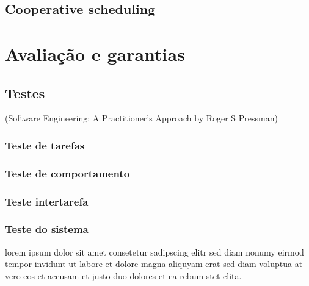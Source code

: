 \subsection{Cooperative scheduling}

\section{\label{sec:secao5}Avaliação e garantias}
\subsection{Testes}
(Software Engineering: A Practitioner's Approach by Roger S Pressman)
\subsubsection{Teste de tarefas}
\subsubsection{Teste de comportamento}
\subsubsection{Teste intertarefa}
\subsubsection{Teste do sistema}
lorem ipsum dolor sit amet consetetur sadipscing elitr sed diam nonumy
eirmod tempor invidunt ut labore et dolore magna aliquyam erat sed diam
voluptua at vero eos et accusam et justo duo dolores et ea rebum
stet clita.~\cite{GOLDENBERGAPL02}
